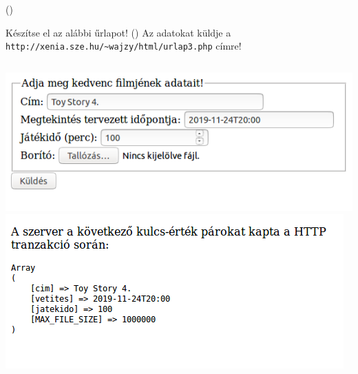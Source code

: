 \begin{frame}
  \begin{exampleblock}{ ()}
    \footnotesize
    
  \end{exampleblock}
\end{frame}

\begin{frame}
  \begin{exampleblock}{Készítse el az alábbi űrlapot! ()}
    Az adatokat küldje a \texttt{http://xenia.sze.hu/\textasciitilde wajzy/html/urlap3.php} címre!
    \begin{columns}[T]
        \includegraphics[width=\textwidth]{urlap4-1.png}
        \includegraphics[width=\textwidth]{urlap4-2.png}
    \end{columns} 
  \end{exampleblock}
\end{frame}

